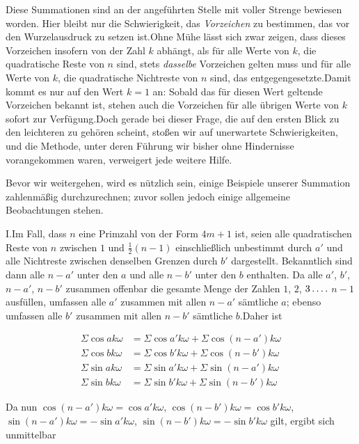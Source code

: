 Diese Summationen sind an der angeführten Stelle mit voller Strenge bewiesen worden. Hier bleibt nur die Schwierigkeit, das \emph{Vorzeichen} zu bestimmen, das vor den Wurzelausdruck zu setzen ist.\quad Ohne Mühe lässt sich zwar zeigen, dass dieses Vorzeichen insofern von der Zahl $k$ abhängt, als für alle Werte von $k$, die quadratische Reste von $n$ sind, stets \emph{dasselbe} Vorzeichen gelten muss und für alle Werte von $k$, die quadratische Nichtreste von $n$ sind, das entgegengesetzte.\quad Damit kommt es nur auf den Wert $k=1$ an: Sobald das für diesen Wert geltende Vorzeichen bekannt ist, stehen auch die Vorzeichen für alle übrigen Werte von $k$ sofort zur Verfügung.\quad Doch gerade bei dieser Frage, die auf den ersten Blick zu den leichteren zu gehören scheint, stoßen wir auf unerwartete Schwierigkeiten, und die Methode, unter deren Führung wir bisher ohne Hindernisse vorangekommen waren, verweigert jede weitere Hilfe.


Bevor wir weitergehen, wird es nützlich sein, einige Beispiele unserer Summation zahlenmäßig durchzurechnen; zuvor sollen jedoch einige allgemeine Beobachtungen stehen.

I.\quad Im Fall, dass $n$ eine Primzahl von der Form $4m+1$ ist, seien alle quadratischen Reste von $n$ zwischen $1$ und $\frac12(n-1)$ einschließlich unbestimmt durch $a'$ und alle Nichtreste zwischen denselben Grenzen durch $b'$ dargestellt. Bekanntlich sind dann alle $n-a'$ unter den $a$ und alle $n-b'$ unter den $b$ enthalten. Da alle $a'$, $b'$, $n-a'$, $n-b'$ zusammen offenbar die gesamte Menge der Zahlen $1$, $2$, $3\mathinner{.\,.\,.\,.}$ $n-1$ ausfüllen, umfassen alle $a'$ zusammen mit allen $n-a'$ sämtliche $a$; ebenso umfassen alle $b'$ zusammen mit allen $n-b'$ sämtliche $b$.\quad Daher ist

\[
\begin{aligned}
\Sigma\cos ak\omega&=\Sigma\cos a'k\omega+\Sigma\cos(n-a')k\omega\\
\Sigma\cos bk\omega&=\Sigma\cos b'k\omega+\Sigma\cos(n-b')k\omega\\
\Sigma\sin ak\omega&=\Sigma\sin a'k\omega+\Sigma\sin(n-a')k\omega\\
\Sigma\sin bk\omega&=\Sigma\sin b'k\omega+\Sigma\sin(n-b')k\omega
\end{aligned}
\]

Da nun $\cos(n-a')k\omega=\cos a'k\omega$, $\cos(n-b')k\omega=\cos b'k\omega$, $\sin(n-a')k\omega=-\sin a'k\omega$, $\sin(n-b')k\omega=-\sin b'k\omega$ gilt, ergibt sich unmittelbar

